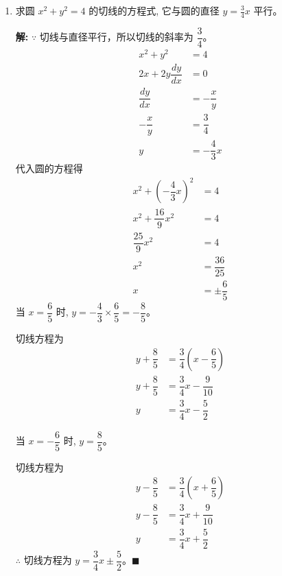 \documentclass[10pt]{article}
\newcommand{\sol}{\textbf{解:} }
\begin{document}
\begin{enumerate}[leftmargin=*]
  \item 求圆 $x^{2}+y^{2}=4$ 的切线的方程式, 它与圆的直径 $y=\frac{3}{4} x$ 平行。

        \sol{}
        $\because$ 切线与直径平行，所以切线的斜率为 $\dfrac{3}{4}$。
        \begin{align*}
          x^{2}+y^{2}          & = 4              \\
          2x+2y \dfrac{dy}{dx} & = 0              \\
          \dfrac{dy}{dx}       & = -\dfrac{x}{y}  \\
          -\dfrac{x}{y}        & = \dfrac{3}{4}   \\
          y                    & = -\dfrac{4}{3}x
        \end{align*}
        代入圆的方程得
        \begin{align*}
          x^{2} + \left(-\dfrac{4}{3}x\right)^{2} & = 4                \\
          x^{2} + \dfrac{16}{9}x^{2}              & = 4                \\
          \dfrac{25}{9}x^{2}                      & = 4                \\
          x^{2}                                   & = \dfrac{36}{25}   \\
          x                                       & = \pm \dfrac{6}{5}
        \end{align*}
        当 $x = \dfrac{6}{5}$ 时, $y = -\dfrac{4}{3} \times \dfrac{6}{5} = -\dfrac{8}{5}$。

        切线方程为
        \begin{align*}
          y + \dfrac{8}{5} & = \dfrac{3}{4}\left(x - \dfrac{6}{5}\right) \\
          y + \dfrac{8}{5} & = \dfrac{3}{4}x - \dfrac{9}{10}             \\
          y                & = \dfrac{3}{4}x - \dfrac{5}{2}
        \end{align*}

        \newpage
        当 $x = -\dfrac{6}{5}$ 时, $y = \dfrac{8}{5}$。

        切线方程为
        \begin{align*}
          y - \dfrac{8}{5} & = \dfrac{3}{4}\left(x + \dfrac{6}{5}\right) \\
          y - \dfrac{8}{5} & = \dfrac{3}{4}x + \dfrac{9}{10}             \\
          y                & = \dfrac{3}{4}x + \dfrac{5}{2}
        \end{align*}
        $\therefore$ 切线方程为 $y = \dfrac{3}{4}x \pm \dfrac{5}{2}$。\hfill$\blacksquare$


\end{enumerate}
\end{document}
